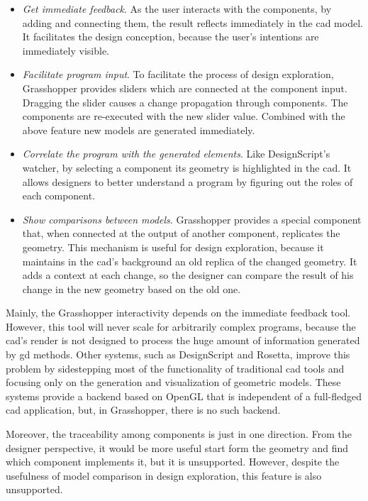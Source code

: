 \begin{itemize}
 \item \textit{Get immediate feedback}. As the user interacts with the components, by adding and connecting them, the result reflects immediately in the \gls{cad} model. It facilitates the design conception, because the user's intentions are immediately visible. 
 \item \textit{Facilitate program input}. To facilitate the process of design exploration, Grasshopper provides sliders which are connected at the component input. Dragging the slider causes a change propagation through components. The components are re-executed with the new slider value. Combined with the above feature new models are generated immediately.
 \item \textit{Correlate the program with the generated elements}. Like DesignScript's watcher, by selecting a component its geometry is highlighted in the \gls{cad}. It allows designers to better understand a program by figuring out the roles of each component.
 \item \textit{Show comparisons between models}. Grasshopper provides a special component that, when connected at the output of another component, replicates the geometry. This mechanism is useful for design exploration, because it maintains in the \gls{cad}'s background an old replica of the changed geometry. It adds a context at each change, so the designer can compare the result of his change in the new geometry based on the old one.
\end{itemize}

Mainly, the Grasshopper interactivity depends on the immediate feedback tool. However, this tool will never scale for arbitrarily complex programs, because the \gls{cad}'s render is not designed to process the huge amount of information generated by \gls{gd} methods. Other systems, such as DesignScript and Rosetta, improve this problem by sidestepping most of the functionality of traditional \gls{cad} tools and focusing only on the generation and visualization of geometric models. These systems provide a backend based on OpenGL that is independent of a full-fledged \gls{cad} application, but, in Grasshopper, there is no such backend.

Moreover, the traceability among components is just in one direction. From the designer perspective, it would be more useful start form the geometry and find which component implements it, but it is unsupported. However, despite the usefulness of model comparison in design exploration, this feature is also unsupported.
